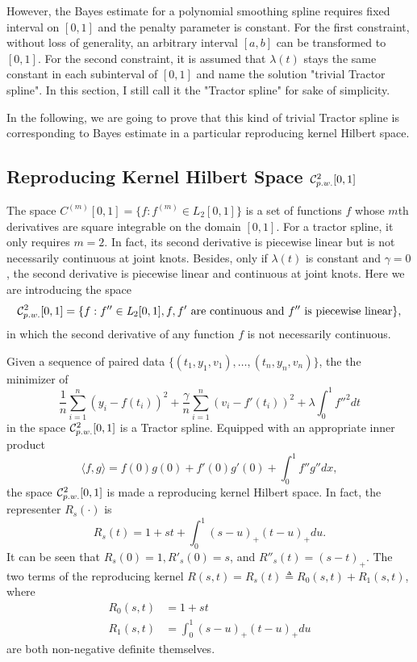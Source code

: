 However, the Bayes estimate for a polynomial smoothing spline requires fixed interval on $[0,1]$ and the penalty parameter is constant. For the first constraint, without loss of generality, an arbitrary interval $[a,b]$ can be transformed to $[0,1]$. For the second constraint, it is assumed that $\lambda(t)$ stays the same constant in each subinterval of $[0,1]$ and name the solution "trivial Tractor spline".  In this section, I still call it the "Tractor spline" for sake of simplicity. 

In the following, we are going to prove that this kind of trivial Tractor spline is corresponding to Bayes estimate in a particular reproducing kernel Hilbert space. 


\subsection{Reproducing Kernel Hilbert Space $\mathcal{C}_{\footnotesize p.w.}^{2}[0,1]$}

The space $C^{(m)}[0,1]=\{ f:f^{(m)}\in \mathit{L}_2[0,1] \}$ is a set of functions $f$ whose $m$th derivatives are square integrable on the domain $[0,1]$. For a tractor spline, it only requires $m=2$. In fact, its second derivative is piecewise linear but is not necessarily continuous at joint knots. Besides, only if $\lambda(t)$ is constant and $\gamma=0$, the second derivative is piecewise linear and continuous at joint knots. Here we are introducing the space 
\begin{equation*}
\mathcal{C}_{\footnotesize p.w.}^{2}[0,1]=\{f: f''\in \mathit{L}_2[0,1], f,f' \mbox{ are continuous and } f'' \mbox{ is piecewise linear}\},
\end{equation*}
in which the second derivative of any function $f$ is not necessarily continuous. 


Given a sequence of paired data $\{(t_1,y_1,v_1),\ldots, (t_n,y_n,v_n) \}$, the the minimizer of 
\begin{equation}\label{maineq}
\frac{1}{n}\sum_{i=1}^{n}(y_i-f(t_i))^2+\frac{\gamma}{n}\sum_{i=1}^{n}(v_i-f'(t_i))^2+\lambda \int_{0}^{1}f''^2dt
\end{equation}
in the space $\mathcal{C}_{\footnotesize p.w.}^{2}[0,1]$ is a Tractor spline. Equipped with an appropriate inner product
\begin{equation}\label{TractorSplineInnerProduct}
\langle f,g \rangle=f(0) g(0)+f'(0) g'(0)+\int_{0}^{1}f''g''dx,
\end{equation}
the space $\mathcal{C}_{\footnotesize p.w.}^{2}[0,1]$ is made a reproducing kernel Hilbert space. In fact, the representer $R_s(\cdot)$ is 
\begin{equation}\label{kerneleq}
R_s(t)=1+st+\int_{0}^{1} (s-u)_+(t-u)_+du.
\end{equation}
It can be seen that $R_s(0)=1, R'_s(0)=s$, and $R''_s(t)=(s-t)_+$. The two terms of the reproducing kernel $R(s,t)=R_s(t)\triangleq R_0(s,t)+R_1(s,t)$, where
\begin{align*} %
R_0(s,t)&=1+st \\ %
R_1(s,t)&=\int_{0}^{1} (s-u)_+(t-u)_+du
\end{align*}
are both non-negative definite themselves.


